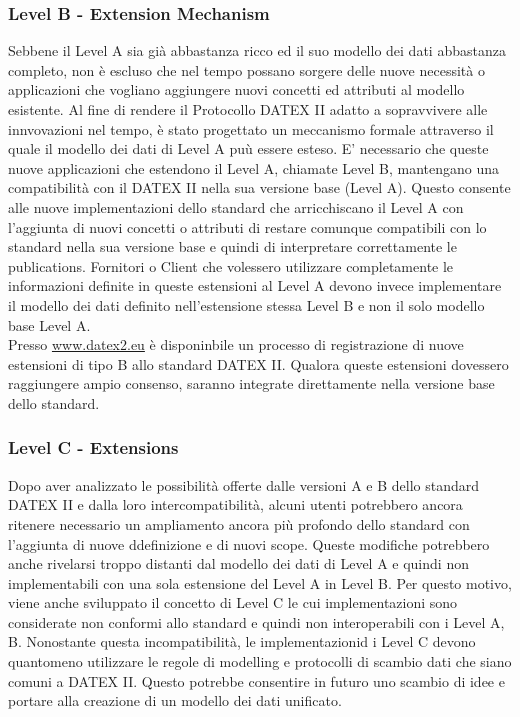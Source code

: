 \subsubsection{Level B - Extension Mechanism}
Sebbene il Level A sia già abbastanza ricco ed il suo modello dei dati abbastanza completo, non è escluso che nel tempo possano sorgere delle nuove necessità o applicazioni che vogliano aggiungere nuovi concetti ed attributi al modello esistente. Al fine di rendere il Protocollo DATEX II adatto a sopravvivere alle innvovazioni nel tempo, è stato progettato un meccanismo formale attraverso il quale il modello dei dati di Level A puù essere esteso. E' necessario che queste nuove applicazioni che estendono il Level A, chiamate Level B, mantengano una compatibilità con il DATEX II nella sua versione base (Level A). Questo consente alle nuove implementazioni dello standard che arricchiscano il Level A con l'aggiunta di nuovi concetti o attributi di restare comunque compatibili con lo standard nella sua versione base e quindi di interpretare correttamente le publications.
Fornitori o Client che volessero utilizzare completamente le informazioni definite in queste estensioni al Level A devono invece implementare il modello dei dati definito nell'estensione stessa Level B e non il solo modello base Level A.\\
Presso \url{www.datex2.eu} è disponinbile un processo di registrazione di nuove estensioni di tipo B allo standard DATEX II. Qualora queste estensioni dovessero raggiungere ampio consenso, saranno integrate direttamente nella versione base dello standard.

\subsubsection{Level C - Extensions}
Dopo aver analizzato le possibilità offerte dalle versioni A e B dello standard DATEX II e dalla loro intercompatibilità, alcuni utenti potrebbero ancora ritenere necessario un ampliamento ancora più profondo dello standard con l'aggiunta di nuove ddefinizione e di nuovi scope. Queste modifiche potrebbero anche rivelarsi troppo distanti dal modello dei dati di Level A e quindi non implementabili con una sola estensione del Level A in Level B. Per questo motivo, viene anche sviluppato il concetto di Level C le cui implementazioni sono considerate non conformi allo standard e quindi non interoperabili con i Level A, B. Nonostante questa incompatibilità, le implementazionid i Level C devono quantomeno utilizzare le regole di modelling e protocolli di scambio dati che siano comuni a DATEX II.
Questo potrebbe consentire in futuro uno scambio di idee e portare alla creazione di un modello dei dati unificato.

